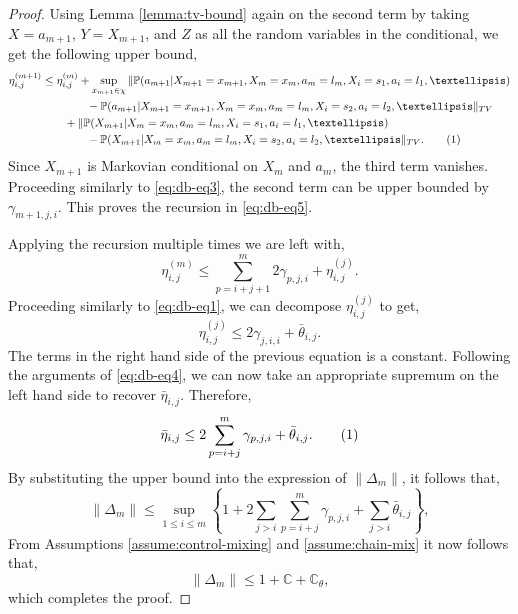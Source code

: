 \documentclass[10pt,a4paper]{amsart}
\newcommand{\Cbb}{\mathbb{C}}
\newcommand{\Pbb}{\mathbb{P}}
\newcommand{\constant}{\Cbb}
\newcommand{\deltam}{\lVert \Delta_m \rVert}
\newcommand{\lc}{\left\{}
\newcommand{\rc}{\right\}}
\newcommand\numberthis{\addtocounter{equation}{1}\tag{\theequation}}
\newcommand{\pow}[1]{^{(#1)}}
\newcommand{\prob}{\Pbb}
\newcommand{\probl}{\prob}
\begin{document}
\begin{proof}
Using Lemma \ref{lemma:tv-bound} again on the second term by taking $X=a_{m+1}$, $Y=X_{m+1}$, and $Z$ as all the random variables in the conditional, we get the following upper bound,
\begin{align*}
    \eta_{i,j}^{(m+1)}& \leq \eta_{i,j}^{(m)} + \sup_{x_{m+1}\in \chi}\|\probl(a_{m+1}|X_{m+1}=x_{m+1},X_{m}=x_{m},a_{m}=l_{m},X_i=s_1,a_i=l_1,\dots)\\
    & \qquad \qquad -\probl(a_{m+1}|X_{m+1}=x_{m+1},X_{m}=x_{m},a_{m}=l_{m},X_i=s_2,a_i=l_2,\dots\|_{TV}\\
    & \qquad + \|\probl(X_{m+1}|X_{m}=x_{m},a_{m}=l_{m},X_i=s_1,a_i=l_1,\dots)\\
    & \qquad \qquad -\probl(X_{m+1}|X_{m}=x_{m},a_{m}=l_{m},X_i=s_2,a_i=l_2,\dots\|_{TV}.\numberthis\label{eq:db-eq2}
\end{align*}
Since $X_{m+1}$ is Markovian conditional on $X_{m}$ and $a_{m}$, the third term vanishes. Proceeding similarly to \cref{eq:db-eq3}, the second term can be upper bounded by $\gamma_{m+1,j,i}$.
This proves the recursion in \cref{eq:db-eq5}.

Applying the recursion multiple times we are left with, 
\[
\eta_{i,j}^{(m)}\leq \sum_{p=i+j+1}^m 2\gamma_{p,j,i}+\eta_{i,j}\pow{j}.
\]
Proceeding similarly to \cref{eq:db-eq1}, we can decompose $\eta_{i,j}\pow{j}$ to get, 
\[
\eta_{i,j}^{(j)}\leq 2\gamma_{j,i,i}+\bar\theta_{i,j}.
\]
The terms in the right hand side of the previous equation is a constant. 
Following the arguments of \cref{eq:db-eq4}, we can now take an appropriate supremum on the left hand side to recover $\bar \eta_{i,j}$. 
Therefore, 
\begin{align*}
     \bar\eta_{i,j}\leq 2\sum_{p=i+j}^m\gamma_{p,j,i}+\bar\theta_{i,j}.\numberthis\label{eq:lem-dbeq1}   
\end{align*}
By substituting the upper bound into the expression of $\deltam$, it follows that, 
\[
    \deltam \leq \sup_{1\leq i\leq m}\lc 1+2\sum_{j>i}\sum_{p=i+j}^m\gamma_{p,j,i}+\sum_{j>i}\bar\theta_{i,j}\rc,
\]
From Assumptions \ref{assume:control-mixing} and \ref{assume:chain-mix} it now follows that,
\[
     \deltam \leq 1+\constant+\constant_{\theta}, 
\]
which completes the proof.
\end{proof}
\end{document}
